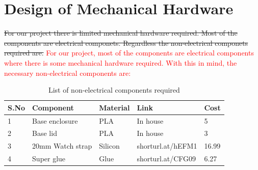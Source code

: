 \documentclass[12pt, titlepage]{article}
\begin{document}
\section{Design of Mechanical Hardware}
\sout{For our project there is limited mechanical hardware required. Most of the components are electrical componets. Regardless the non-electrical componets required are.}
\textcolor{red}{For our project, most of the components are electrical components where there is some mechanical hardware required. With this in mind, the necessary non-electrical components are:}
\begin{table}[H]
\centering
\begin{tabular}{lllll}
S.No & Component        & Material & Link              & Cost  \\ \hline
1    & Base enclosure   & PLA      & In house          & 5     \\
2    & Base lid         & PLA      & In house          & 3     \\
3    & 20mm Watch strap & Silicon  & shorturl.at/hEFM1 & 16.99 \\
4    & Super glue       & Glue     & shorturl.at/CFG09 & 6.27 
\end{tabular}
\label{tab:my-table}
\caption{List of non-electrical components required}
\end{table}
\end{document}
